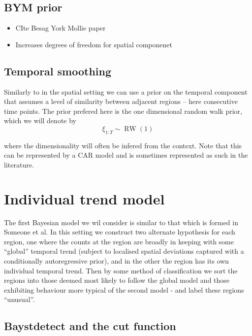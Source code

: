 \documentclass{report}
\begin{document}
\subsection{BYM prior}

\begin{itemize}
\item CIte Besag York Mollie paper
\item Increases degrees of freedom for spatial componenet
\end{itemize}

\subsection{Temporal smoothing}

Similarly to in the spatial setting we can use a prior on the temporal component that assumes a level of similarity between adjacent regions -- here consecutive time points. The prior prefered here is the one dimensional random walk prior, which we will denote by
\begin{equation}
\xi_{1:T} \sim \operatorname{RW}(1)
\end{equation}

where the dimensionality will often be infered from the context. Note that this can be represented by a CAR model and is sometimes represented as such in the literature. 

\section{Individual trend model}

The first Bayesian model we wil consider is similar to that which is formed in Someone et al. In this setting we construct two alternate hypothesis for each region, one where the counts at the region are broadly in keeping with some ``global'' temporal trend (subject to localised spatial deviations captured with a conditionally autoregressive prior), and in the other the region has its own individual temporal trend. Then by some method of classification we sort the regions into those deemed most likely to follow the global model and those exhibiting behaviour more typical of the second model - and label these regions ``unusual''.

\subsection{Baystdetect and the cut function}
\end{document}
